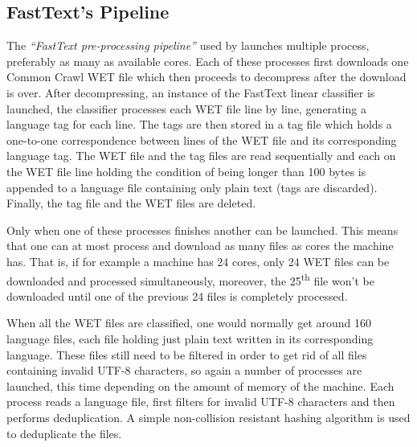 \subsection{FastText's Pipeline}

The \emph{``FastText pre-processing pipeline''} used by \citet{grave-etal-2018-learning} launches multiple process, preferably as many as available cores. Each of these processes first downloads one Common Crawl WET file which then proceeds to decompress after the download is over. After decompressing, an instance of the FastText linear classifier \citep{joulin-etal-2016-fasttext, joulin-etal-2017-bag} is launched, the classifier processes each WET file line by line, generating a language tag for each line. The tags are then stored in a tag file which holds a one-to-one correspondence between lines of the WET file and its corresponding language tag. The WET file and the tag files are read sequentially and each on the WET file line holding the condition of being longer than 100 bytes is appended to a language file containing only plain text (tags are discarded). Finally, the tag file and the WET files are deleted.

Only when one of these processes finishes another can be launched. This means that one can at most process and download as many files as cores the machine has. That is, if for example a machine has 24 cores, only 24 WET files can be downloaded and processed simultaneously, moreover, the 25\textsuperscript{th} file won't be downloaded until one of the previous 24 files is completely processed.

When all the WET files are classified, one would normally get around 160 language files, each file holding just plain text written in its corresponding language. These files still need to be filtered in order to get rid of all files containing invalid UTF-8 characters, so again a number of processes are launched, this time depending on the amount of memory of the machine. Each process reads a language file, first filters for invalid UTF-8 characters and then performs deduplication. A simple non-collision resistant hashing algorithm is used to deduplicate the files.

